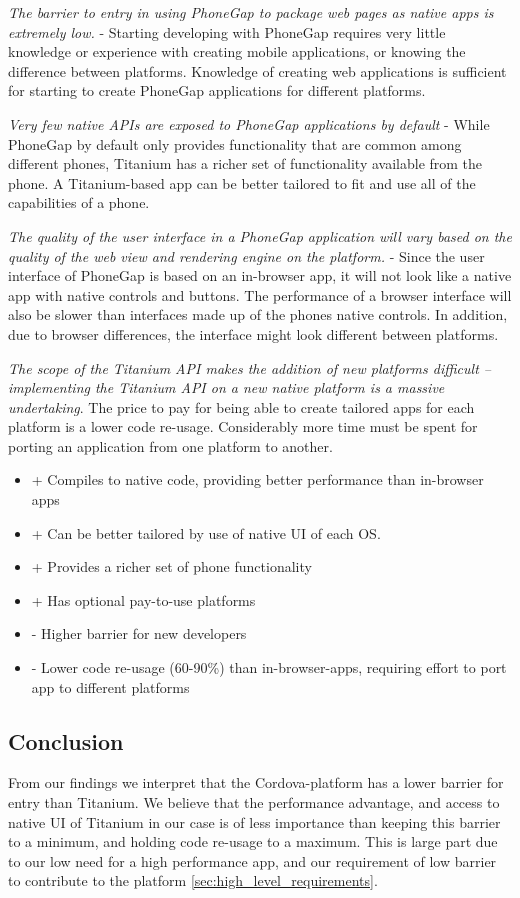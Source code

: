 \emph{The barrier to entry in using PhoneGap to package web pages as native apps is extremely low.} - Starting developing with PhoneGap requires very little knowledge or experience with creating mobile applications, or knowing the difference between platforms. Knowledge of creating web applications is sufficient for starting to create PhoneGap applications for different platforms.

\emph{Very few native APIs are exposed to PhoneGap applications by default} - While PhoneGap by default only provides functionality that are common among different phones, Titanium has a richer set of functionality available from the phone. A Titanium-based app can be better tailored to fit and use all of the capabilities of a phone.

\emph{The quality of the user interface in a PhoneGap application will vary based on the quality of the web view and rendering engine on the platform.} - Since the user interface of PhoneGap is based on an in-browser app, it will not look like a native app with native controls and buttons. The performance of a browser interface will also be slower than interfaces made up of the phones native controls. In addition, due to browser differences, the interface might look different between platforms. 

\emph{The scope of the Titanium API makes the addition of new platforms difficult – implementing the Titanium API on a new native platform is a massive undertaking}. The price to pay for being able to create tailored apps for each platform is a lower code re-usage. Considerably more time must be spent for porting an application from one platform to another. 

\begin{itemize}
\item{+ Compiles to native code, providing better performance than in-browser apps}
\item{+ Can be better tailored by use of native UI of each OS.}
\item{+ Provides a richer set of phone functionality}
\item{+ Has optional pay-to-use platforms}
\item{- Higher barrier for new developers}
\item{- Lower code re-usage (60-90\%) than in-browser-apps, requiring effort to port app to different platforms}
\end{itemize}

\subsection{Conclusion}
From our findings we interpret that the Cordova-platform has a lower barrier for entry than Titanium. We believe that the performance advantage, and access to native UI of Titanium in our case is of less importance than keeping this barrier to a minimum, and holding code re-usage to a maximum. This is large part due to our low need for a high performance app, and our requirement of low barrier to contribute to the platform \ref{sec:high_level_requirements}.

